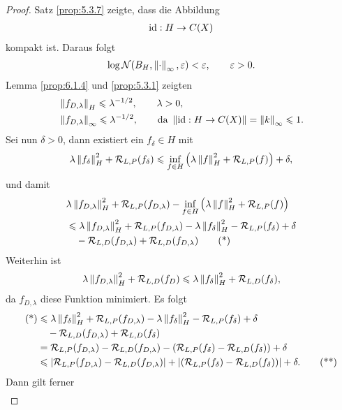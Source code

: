 \begin{proof}
Satz \ref{prop:5.3.7} zeigte, dass die Abbildung
\begin{align*}
\operatorname{id} : H \to C(X)
\end{align*}
kompakt ist. Daraus folgt
\begin{align*}
\log\mathcal{N}(B_H,\left\|\cdot\right\|_\infty,\varepsilon) < \varepsilon,\qquad \varepsilon > 0.
\end{align*}
Lemma \ref{prop:6.1.4} und \ref{prop:5.3.1} zeigten
\begin{align*}
&\left\|f_{D,\lambda}\right\|_H \leqslant \lambda^{-1/2},\qquad \lambda > 0,\\
&\left\|f_{D,\lambda}\right\|_\infty \leqslant \lambda^{-1/2},\qquad \text{da }\left\|\operatorname{id}: H\to
C(X)\right\| = \left\|k\right\|_\infty \leqslant 1.
\end{align*} 
Sei nun $\delta > 0$, dann existiert ein $f_\delta\in H$ mit
\begin{align*}
\lambda\left\|f_\delta\right\|_H^2 + \mathcal{R}_{L,P}(f_\delta) \leqslant
\inf_{f\in H} \left(\lambda \left\|f\right\|_H^2  + \mathcal{R}_{L,P}(f) \right) + \delta,
\end{align*}
und damit
\begin{align*}
&\lambda\left\|f_{D,\lambda}\right\|^2_H  + \mathcal{R}_{L,P}(f_{D,\lambda}) -
\inf_{f\in H}\left(\lambda\left\|f\right\|_H^2 + \mathcal{R}_{L,P}(f) \right)\\
&\leqslant
\lambda\left\|f_{D,\lambda}\right\|^2_H  + \mathcal{R}_{L,P}(f_{D,\lambda}) -
\lambda\left\|f_\delta\right\|_H^2 - \mathcal{R}_{L,P}(f_\delta) + \delta\\
&\quad -\mathcal{R}_{L,D}(f_{D,\lambda}) + \mathcal{R}_{L,D}(f_{D,\lambda})
\tag{*}
\end{align*}
Weiterhin ist
\begin{align*}
\lambda\left\|f_{D,\lambda}\right\|^2_H  + \mathcal{R}_{L,D}(f_D) \leqslant
\lambda\left\|f_\delta\right\|_H^2 + \mathcal{R}_{L,D}(f_\delta),
\end{align*}
da $f_{D,\lambda}$ diese Funktion minimiert. Es folgt
\begin{align*}
\text{(*)} &\leqslant
\lambda\left\|f_\delta\right\|_H^2 + \mathcal{R}_{L,P}(f_{D,\lambda}) 
-\lambda\left\|f_\delta\right\|_H^2 - \mathcal{R}_{L,P}(f_\delta)
+ \delta\\
&\quad -\mathcal{R}_{L,D}(f_{D,\lambda}) + \mathcal{R}_{L,D}(f_\delta)\\
&=
\mathcal{R}_{L,P}(f_{D,\lambda}) - \mathcal{R}_{L,D}(f_{D,\lambda}) - \left(\mathcal{R}_{L,P}(f_\delta)
- \mathcal{R}_{L,D}(f_\delta)\right) + \delta\\
&\leqslant 
\left|\mathcal{R}_{L,P}(f_{D,\lambda}) - \mathcal{R}_{L,D}(f_{D,\lambda})\right| +
\left|\left(\mathcal{R}_{L,P}(f_\delta) - \mathcal{R}_{L,D}(f_\delta)\right)\right| + \delta.\tag{**}
\end{align*}
Dann gilt ferner
\begin{align*}

\end{align*}
\end{proof}
